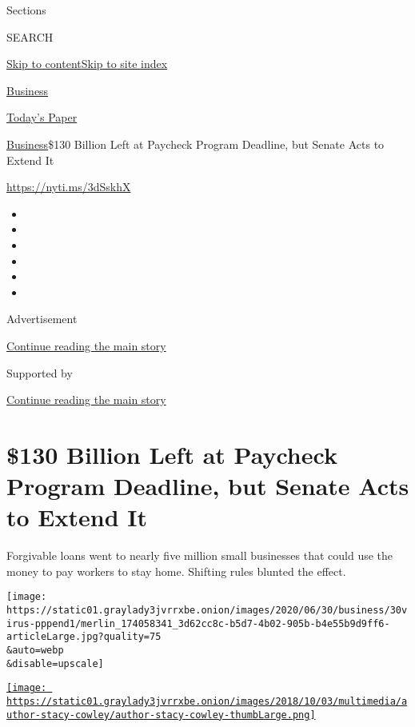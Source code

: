 Sections

SEARCH

\protect\hyperlink{site-content}{Skip to
content}\protect\hyperlink{site-index}{Skip to site index}

\href{https://www.nytimes3xbfgragh.onion/section/business}{Business}

\href{https://myaccount.nytimes3xbfgragh.onion/auth/login?response_type=cookie\&client_id=vi}{}

\href{https://www.nytimes3xbfgragh.onion/section/todayspaper}{Today's
Paper}

\href{/section/business}{Business}\textbar{}\$130 Billion Left at
Paycheck Program Deadline, but Senate Acts to Extend It

\url{https://nyti.ms/3dSskhX}

\begin{itemize}
\item
\item
\item
\item
\item
\item
\end{itemize}

Advertisement

\protect\hyperlink{after-top}{Continue reading the main story}

Supported by

\protect\hyperlink{after-sponsor}{Continue reading the main story}

\hypertarget{130-billion-left-at-paycheck-program-deadline-but-senate-acts-to-extend-it}{%
\section{\$130 Billion Left at Paycheck Program Deadline, but Senate
Acts to Extend
It}\label{130-billion-left-at-paycheck-program-deadline-but-senate-acts-to-extend-it}}

Forgivable loans went to nearly five million small businesses that could
use the money to pay workers to stay home. Shifting rules blunted the
effect.

\texttt{[image: https://static01.graylady3jvrrxbe.onion/images/2020/06/30/business/30virus-pppend1/merlin\_174058341\_3d62cc8c-b5d7-4b02-905b-b4e55b9d9ff6-articleLarge.jpg?quality=75\\\&auto=webp\\\&disable=upscale]}

\href{https://www.nytimes3xbfgragh.onion/by/stacy-cowley}{\texttt{[image: https://static01.graylady3jvrrxbe.onion/images/2018/10/03/multimedia/author-stacy-cowley/author-stacy-cowley-thumbLarge.png]}}

